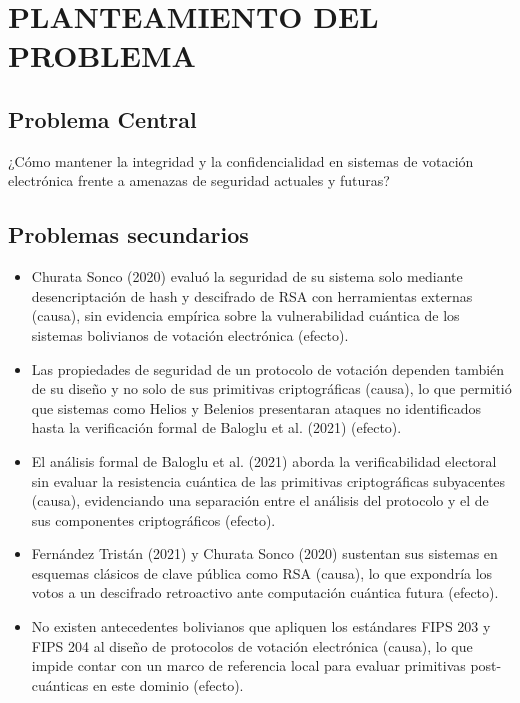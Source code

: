 \section{PLANTEAMIENTO DEL PROBLEMA}
\subsection{Problema Central}
¿Cómo mantener  la integridad y la confidencialidad en sistemas de votación electrónica frente a amenazas de seguridad actuales y futuras?
\subsection{Problemas secundarios}
\begin{itemize}
	\item Churata Sonco (2020) evaluó la seguridad de su sistema solo mediante desencriptación de hash y descifrado de RSA con herramientas externas (causa), sin evidencia empírica sobre la vulnerabilidad cuántica de los sistemas bolivianos de votación electrónica (efecto).
	
	\item Las propiedades de seguridad de un protocolo de votación dependen también de su diseño y no solo de sus primitivas criptográficas (causa), lo que permitió que sistemas como Helios y Belenios presentaran ataques no identificados hasta la verificación formal de Baloglu et al. (2021) (efecto).
	
	\item El análisis formal de Baloglu et al. (2021) aborda la verificabilidad electoral sin evaluar la resistencia cuántica de las primitivas criptográficas subyacentes (causa), evidenciando una separación entre el análisis del protocolo y el de sus componentes criptográficos (efecto).
	
	\item Fernández Tristán (2021) y Churata Sonco (2020) sustentan sus sistemas en esquemas clásicos de clave pública como RSA (causa), lo que expondría los votos a un descifrado retroactivo ante computación cuántica futura (efecto).
	
	\item No existen antecedentes bolivianos que apliquen los estándares FIPS 203 y FIPS 204 al diseño de protocolos de votación electrónica (causa), lo que impide contar con un marco de referencia local para evaluar primitivas post-cuánticas en este dominio (efecto).
\end{itemize}